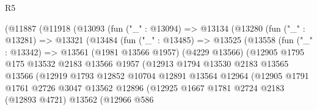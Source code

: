 \begin{lexlean}{R5}
\begin{coremodule}
                    (@11887
                      (@11918
                        (@13093
                          (fun ("_" : @13094) =>
                          @13134
                            (@13280
                              (fun ("_" : @13281) =>
                              @13321
                                (@13484
                                  (fun ("_" : @13485) =>
                                  @13525
                                    (@13558
                                      (fun ("_" : @13342) =>
                                      @13561
                                        (@1981 @13566 @1957)
                                        (@4229 @13566)
                                        (@12905
                                          @1795
                                          @175
                                          @13532
                                          @2183
                                          @13566
                                          @1957
                                          (@12913
                                            @1794
                                            @13530
                                            @2183
                                            @13565
                                            @13566
                                            (@12919
                                              @1793
                                              @12852
                                              @10704
                                              @12891
                                              @13564
                                              @12964
                                              (@12905
                                                @1791
                                                @1761
                                                @2726
                                                @3047
                                                @13562
                                                @12896
                                                (@12925
                                                  @1667
                                                  @1781
                                                  @2724
                                                  @2183
                                                  (@12893 @4721)
                                                  @13562
                                                  (@12966
                                                    @586

\end{coremodule}
\end{lexlean}
